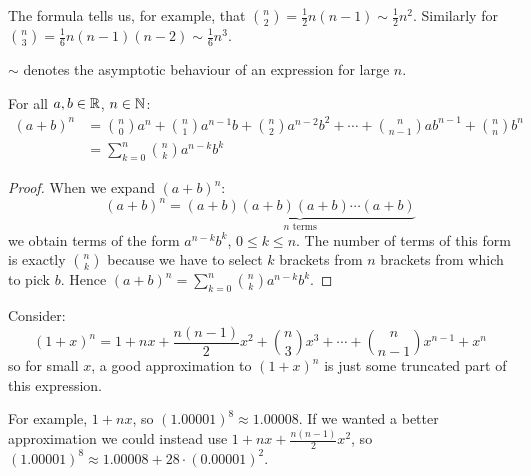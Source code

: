 \documentclass[../main.tex]{subfiles}
\begin{document}
\begin{remark}[Note]
  The formula tells us, for example, that $\binom{n}{2} = \frac{1}{2}n(n-1) \sim \frac{1}{2}n^2$.
  Similarly for $\binom{n}{3} = \frac{1}{6}n(n-1)(n-2) \sim \frac{1}{6}n^3$.
\end{remark}
\begin{remark}[Notation]
  $\sim$ denotes the asymptotic behaviour of an expression for large $n$.
\end{remark}
\begin{theorem}
  For all $a, b \in \mathbb{R}$, $n \in \mathbb{N}$:
  \begin{align*}
    (a + b)^{n} &= \binom{n}{0}a^{n} + \binom{n}{1}a^{n - 1}b + \binom{n}{2}a^{n-2}b^{2} + \cdots + \binom{n}{n-1}ab^{n-1} + \binom{n}{n}b^{n} \\
                &=\sum_{k=0}^{n} \binom{n}{k}a^{n - k} b^{k}
  \end{align*}
\end{theorem}
\begin{proof}
  When we expand $(a + b)^{n}$:
  \[
    (a+b)^{n} = \underbrace{(a + b)(a + b)(a + b) \cdots (a + b)}_{n \text{ terms}}
  \]
  we obtain terms of the form $a^{n - k}b^{k}$, $0 \leq k \leq n$.
  The number of terms of this form is exactly $\binom{n}{k}$ because we have to select $k$ brackets from $n$ brackets from which to pick $b$.
  Hence $(a + b)^{n} = \sum_{k=0}^{n} \binom{n}{k}a^{n - k}b^{k}$.
\end{proof}
\begin{example}
  Consider:
  \[
    (1 + x)^{n} = 1 + nx + \frac{n(n-1)}{2}x^2 + \binom{n}{3}x^3 + \cdots + \binom{n}{n-1}x^{n-1} + x^{n}
  \]
  so for small $x$, a good approximation to $(1 + x)^{n}$ is just some truncated part of this expression.

  For example, $1 + nx$, so $(1.00001)^{8} \approx 1.00008$.
  If we wanted a better approximation we could instead use $1 + nx + \frac{n(n-1)}{2}x^2$, so $(1.00001)^{8} \approx 1.00008 + 28 \cdot (0.00001)^{2}$.
\end{example}
\end{document}
